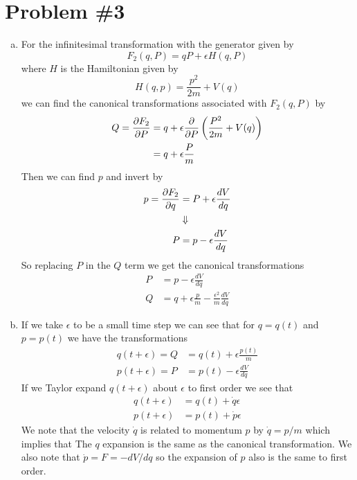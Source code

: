 \documentclass[11pt]{article}
\numberwithin{equation}{section}
\begin{document}
\section{Problem \#3}
\begin{enumerate}[(a)]
\item For the infinitesimal transformation with the generator given by
$$F_2(q,P) = qP + \epsilon{H(q,P)}$$
where $H$ is the Hamiltonian given by
$$H(q,p) = \frac{p^2}{2m} + V(q)$$
we can find the canonical transformations associated with $F_2(q,P)$ by 
\begin{align*}
Q = \frac{\partial{F_2}}{\partial{P}} &= q + \epsilon\frac{\partial{}}{\partial{P}}\left(\frac{P^2}{2m} + V(q)\right)\\
&= q + \epsilon\frac{P}{m}
\end{align*}
Then we can find $p$ and invert by
\begin{align*}
p = \frac{\partial{F_2}}{\partial{q}} &= P + \epsilon\frac{dV}{dq}\\
&\Downarrow\\
P &= p - \epsilon\frac{dV}{dq}
\end{align*}
So replacing $P$ in the $Q$ term we get the canonical transformations 
\begin{align*}
P &= p - \epsilon\frac{dV}{dq}\\
Q &= q + \epsilon\frac{p}{m} - \frac{\epsilon^2}{m}\frac{dV}{dq}
\end{align*}

\item If we take $\epsilon$ to be a small time step we can see that for $q=q(t)$ and $p=p(t)$
we have the transformations
\begin{align*}
q(t+\epsilon) = Q &= q(t) + \epsilon\frac{p(t)}{m}\\
p(t+\epsilon) = P &= p(t) - \epsilon\frac{dV}{dq}
\end{align*}
If we Taylor expand $q(t+\epsilon)$ about $\epsilon$ to first order we see that
\begin{align*}
q(t+\epsilon) &= q(t) + \dot{q}\epsilon\\
p(t+\epsilon) &= p(t) + \dot{p}\epsilon
\end{align*}
We note that the velocity $\dot{q}$ is related to momentum $p$ by $\dot{q}=p/m$ which implies
that The $q$ expansion is the same as the canonical transformation. We also note that 
$\dot{p} = F = -dV/dq$ so the expansion of $p$ also is the same to first order.


\end{enumerate}
\end{document}
